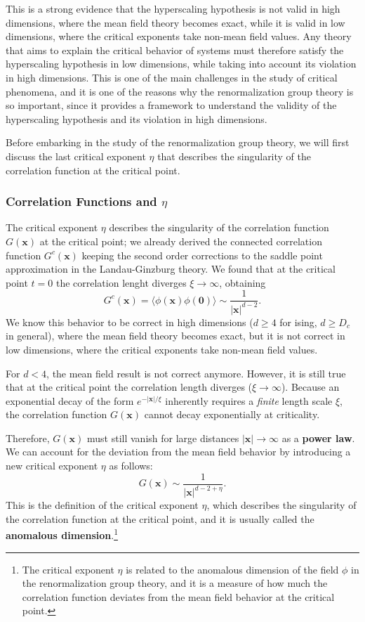 This is a strong evidence that the hyperscaling hypothesis is not valid in high dimensions, where the mean field theory becomes exact, while it is valid in low dimensions, where the critical exponents take non-mean field values. Any theory that aims to explain the critical behavior of systems must therefore satisfy the hyperscaling hypothesis in low dimensions, while taking into account its violation in high dimensions. This is one of the main challenges in the study of critical phenomena, and it is one of the reasons why the renormalization group theory is so important, since it provides a framework to understand the validity of the hyperscaling hypothesis and its violation in high dimensions.

Before embarking in the study of the renormalization group theory, we will first discuss the last critical exponent \(\eta\) that describes the singularity of the correlation function at the critical point.

\subsubsection{Correlation Functions and \(\eta\)}

The critical exponent \(\eta\) describes the singularity of the correlation function \(G(\mathbf{x})\) at the critical point; we already derived the connected correlation function \(G^c(\mathbf{x})\) keeping the second order corrections to the saddle point approximation in the Landau-Ginzburg theory. We found that at the critical point \(t=0\) the correlation lenght diverges \(\xi \to \infty\), obtaining
\[
    G^c(\mathbf{x}) = \langle \phi(\mathbf{x}) \phi(\mathbf{0}) \rangle \sim \frac{1}{\vert \mathbf{x} \vert^{d-2}}.
\]
We know this behavior to be correct in high dimensions (\(d\geq 4\) for ising, \(d \geq D_c\) in general), where the mean field theory becomes exact, but it is not correct in low dimensions, where the critical exponents take non-mean field values.

For \(d < 4\), the mean field result is not correct anymore. However, it is still true that at the critical point the correlation length diverges (\(\xi \to \infty\)). Because an exponential decay of the form \(e^{- \vert \mathbf{x} \vert / \xi}\) inherently requires a \textit{finite} length scale \(\xi\), the correlation function \(G(\mathbf{x})\) cannot decay exponentially at criticality.

Therefore, \(G(\mathbf{x})\) must still vanish for large distances \(\vert \mathbf{x} \vert \to \infty\) as a \textbf{power law}. We can account for the deviation from the mean field behavior by introducing a new critical exponent \(\eta\) as follows:
\[
    G(\mathbf{x}) \sim \frac{1}{\vert \mathbf{x} \vert^{d-2+\eta}}.
\]
This is the definition of the critical exponent \(\eta\), which describes the singularity of the correlation function at the critical point, and it is usually called the \textbf{anomalous dimension}.\footnote{The critical exponent \(\eta\) is related to the anomalous dimension of the field \(\phi\) in the renormalization group theory, and it is a measure of how much the correlation function deviates from the mean field behavior at the critical point.}

